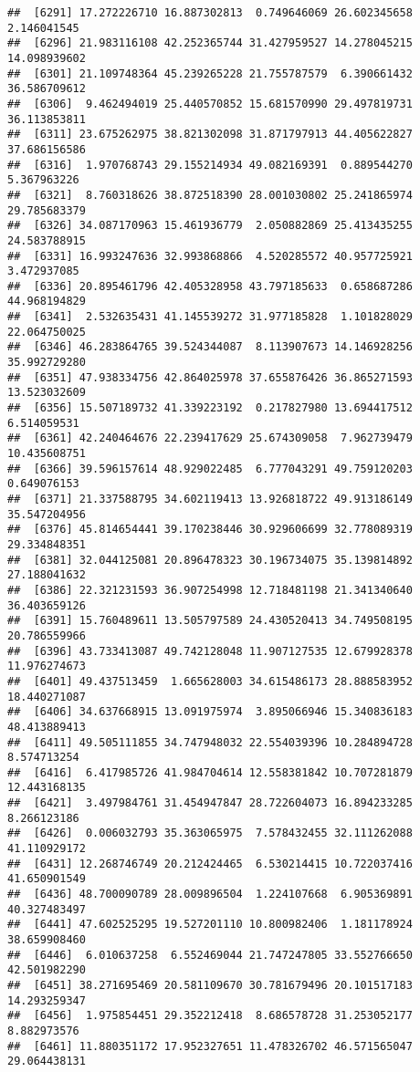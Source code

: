 \documentclass[
]{article}
\begin{document}
\begin{verbatim}
##  [6291] 17.272226710 16.887302813  0.749646069 26.602345658  2.146041545
##  [6296] 21.983116108 42.252365744 31.427959527 14.278045215 14.098939602
##  [6301] 21.109748364 45.239265228 21.755787579  6.390661432 36.586709612
##  [6306]  9.462494019 25.440570852 15.681570990 29.497819731 36.113853811
##  [6311] 23.675262975 38.821302098 31.871797913 44.405622827 37.686156586
##  [6316]  1.970768743 29.155214934 49.082169391  0.889544270  5.367963226
##  [6321]  8.760318626 38.872518390 28.001030802 25.241865974 29.785683379
##  [6326] 34.087170963 15.461936779  2.050882869 25.413435255 24.583788915
##  [6331] 16.993247636 32.993868866  4.520285572 40.957725921  3.472937085
##  [6336] 20.895461796 42.405328958 43.797185633  0.658687286 44.968194829
##  [6341]  2.532635431 41.145539272 31.977185828  1.101828029 22.064750025
##  [6346] 46.283864765 39.524344087  8.113907673 14.146928256 35.992729280
##  [6351] 47.938334756 42.864025978 37.655876426 36.865271593 13.523032609
##  [6356] 15.507189732 41.339223192  0.217827980 13.694417512  6.514059531
##  [6361] 42.240464676 22.239417629 25.674309058  7.962739479 10.435608751
##  [6366] 39.596157614 48.929022485  6.777043291 49.759120203  0.649076153
##  [6371] 21.337588795 34.602119413 13.926818722 49.913186149 35.547204956
##  [6376] 45.814654441 39.170238446 30.929606699 32.778089319 29.334848351
##  [6381] 32.044125081 20.896478323 30.196734075 35.139814892 27.188041632
##  [6386] 22.321231593 36.907254998 12.718481198 21.341340640 36.403659126
##  [6391] 15.760489611 13.505797589 24.430520413 34.749508195 20.786559966
##  [6396] 43.733413087 49.742128048 11.907127535 12.679928378 11.976274673
##  [6401] 49.437513459  1.665628003 34.615486173 28.888583952 18.440271087
##  [6406] 34.637668915 13.091975974  3.895066946 15.340836183 48.413889413
##  [6411] 49.505111855 34.747948032 22.554039396 10.284894728  8.574713254
##  [6416]  6.417985726 41.984704614 12.558381842 10.707281879 12.443168135
##  [6421]  3.497984761 31.454947847 28.722604073 16.894233285  8.266123186
##  [6426]  0.006032793 35.363065975  7.578432455 32.111262088 41.110929172
##  [6431] 12.268746749 20.212424465  6.530214415 10.722037416 41.650901549
##  [6436] 48.700090789 28.009896504  1.224107668  6.905369891 40.327483497
##  [6441] 47.602525295 19.527201110 10.800982406  1.181178924 38.659908460
##  [6446]  6.010637258  6.552469044 21.747247805 33.552766650 42.501982290
##  [6451] 38.271695469 20.581109670 30.781679496 20.101517183 14.293259347
##  [6456]  1.975854451 29.352212418  8.686578728 31.253052177  8.882973576
##  [6461] 11.880351172 17.952327651 11.478326702 46.571565047 29.064438131

\end{verbatim}
\end{document}
